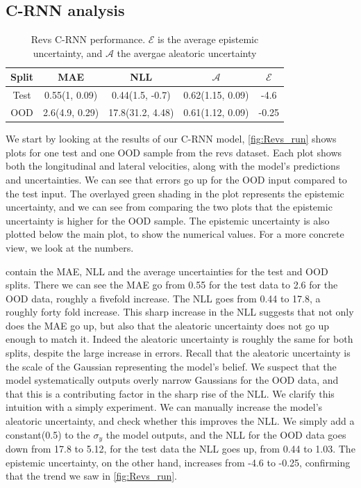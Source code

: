 \subsection{C-RNN analysis}

\begin{table}[htbp]
\centering
    \begin{tabular}{c  c  c   c  c }  
        \toprule
        Split & MAE & NLL & $\mathcal{A}$ & $\mathcal{E}$\\
        \midrule
        Test & 0.55(1, 0.09) & 0.44(1.5, -0.7) & 0.62(1.15, 0.09) &  -4.6\\
        OOD  &  2.6(4.9, 0.29) &  17.8(31.2, 4.48) & 0.61(1.12, 0.09)&  -0.25\\
        \midrule
    \end{tabular}
    \caption{Revs C-RNN performance. $\mathcal{E}$ is the average epistemic uncertainty, and $\mathcal{A}$ the avergae aleatoric uncertainty}
    \label{tbl:revs}
\end{table}

We start by looking at the results of our C-RNN model, \cref{fig:Revs_run} shows plots for one test and one OOD sample from the revs dataset. Each plot shows both the longitudinal and lateral velocities, along with the model's predictions and uncertainties.
We can see that errors go up for the OOD input compared to the test input. The overlayed green shading in the plot represents the epistemic uncertainty, and we can see from comparing the two plots that the epistemic uncertainty is higher for the OOD sample. The epistemic uncertainty is also plotted below the main plot, to show the numerical values. For a more concrete view, we look at the numbers.

 contain the MAE, NLL and the average uncertainties for the test and OOD splits. There we can see the MAE go from 0.55 for the test data to 2.6 for the OOD data, roughly a fivefold increase. The NLL goes from 0.44 to 17.8, a roughly forty fold increase. This sharp increase in the NLL suggests that not only does the MAE go up, but also that the aleatoric uncertainty does not go up enough to match it. Indeed the aleatoric uncertainty is roughly the same for both splits, despite the large increase in errors. 
Recall that the aleatoric uncertainty is the scale of the Gaussian representing the model's belief. We suspect that the model systematically outputs overly narrow Gaussians for the OOD data, and that this is a contributing factor in the sharp rise of the NLL.  
We clarify this intuition with a simply experiment. We can manually increase the model's aleatoric uncertainty, and check whether this improves the NLL. We simply add a constant(0.5) to the $\sigma_y$ the model outputs, and the NLL for the OOD data goes down from 17.8 to 5.12, for the test data the NLL goes up, from 0.44 to 1.03. The epistemic uncertainty, on the other hand, increases from -4.6 to -0.25, confirming that the trend we saw in \cref{fig:Revs_run}.  


